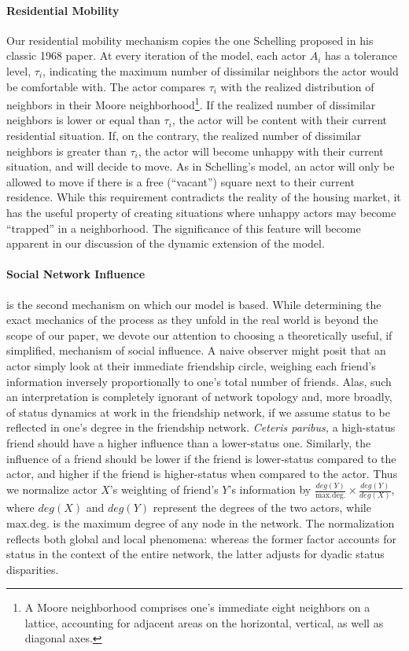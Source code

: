 \documentclass[a4paper,10pt]{article}
\begin{document}
\paragraph{Residential Mobility} Our residential mobility mechanism copies the one Schelling proposed in his classic 1968 paper. At every iteration of the model, each actor $A_i$ has a tolerance level, $\tau_i$, indicating the maximum number of dissimilar neighbors the actor would be comfortable with. The actor compares $\tau_i$ with the realized distribution of neighbors in their Moore neighborhood\footnote{A Moore neighborhood comprises one's immediate eight neighbors on a lattice, accounting for adjacent areas on the horizontal, vertical, as well as diagonal axes.}. If the realized number of dissimilar neighbors is lower or equal than $\tau_i$, the actor will be content with their current residential situation. If, on the contrary, the realized number of dissimilar neighbors is greater than $\tau_i$, the actor will become unhappy with their current situation, and will decide to move. As in Schelling's model, an actor will only be allowed to move if there is a free (``vacant'') square next to their current residence. While this requirement contradicts the reality of the housing market, it has the useful property of creating situations where unhappy actors may become ``trapped'' in a neighborhood. The significance of this feature will become apparent in our discussion of the dynamic extension of the model. 

\paragraph{Social Network Influence} is the second mechanism on which our model is based. While determining the exact mechanics of the process as they unfold in the real world is beyond the scope of our paper, we devote our attention to choosing a theoretically useful, if simplified, mechanism of social influence. A naive observer might posit that an actor  simply look at their immediate friendship circle, weighing each friend's information inversely proportionally to one's total number of friends. Alas, such an interpretation is completely ignorant of network topology and, more broadly, of status dynamics at work in the friendship network, if we assume status to be reflected in one's degree in the friendship network. \textit{Ceteris paribus,} a high-status friend should have a higher influence than a lower-status one. Similarly, the influence of a friend should be lower if the friend is lower-status compared to the actor, and higher if the friend is higher-status when compared to the actor. Thus we normalize actor $X$'s weighting of friend's $Y$'s information by $\frac{deg(Y)}{\mathrm{max.deg.}} \times \frac{deg(Y)}{deg(X)}$, where $deg(X)$ and $deg(Y)$ represent the degrees of the two actors, while $\mathrm{max.deg.}$ is the maximum degree of any node in the network. The normalization reflects both global and local phenomena: whereas the former factor accounts for status in the context of the entire network, the latter adjusts for dyadic status disparities.
\end{document}
